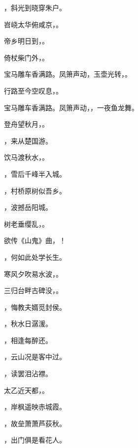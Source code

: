 \documentclass[12pt, a4paper, addpoints]{exam}
\begin{document}
\begin{questions}
\question[1] \uline{\qquad\qquad\qquad}，斜光到晓穿朱户。

\question[1] 岧峣太华俯咸京，\uline{\qquad\qquad\qquad}。

\question[1] 帝乡明日到，\uline{\qquad\qquad\qquad}。

\question[1] 倚杖柴门外，\uline{\qquad\qquad\qquad}。

\question[1] 宝马雕车香满路。凤箫声动，玉壶光转，\uline{\qquad\qquad\qquad}。

\question[1] 行路至今空叹息，\uline{\qquad\qquad\qquad}。

\question[1] 宝马雕车香满路。凤箫声动，\uline{\qquad\qquad\qquad}，一夜鱼龙舞。

\question[1] 登舟望秋月，\uline{\qquad\qquad\qquad}。

\question[1] \uline{\qquad\qquad\qquad}，来从楚国游。

\question[1] 饮马渡秋水，\uline{\qquad\qquad\qquad}。

\question[1] \uline{\qquad\qquad\qquad}，雪后千峰半入城。

\question[1] \uline{\qquad\qquad\qquad}，村桥原树似吾乡。

\question[1] \uline{\qquad\qquad\qquad}，波撼岳阳城。

\question[1] 树老垂缨乱，\uline{\qquad\qquad\qquad}。

\question[1] 欲传《山鬼》曲，\uline{\qquad\qquad\qquad}！

\question[1] \uline{\qquad\qquad\qquad}，何如此处学长生。

\question[1] 寒风夕吹易水波，\uline{\qquad\qquad\qquad}。

\question[1] 三归台畔古碑没，\uline{\qquad\qquad\qquad}。

\question[1] \uline{\qquad\qquad\qquad}，悔教夫婿觅封侯。

\question[1] \uline{\qquad\qquad\qquad}，秋水日潺湲。

\question[1] \uline{\qquad\qquad\qquad}，相逢每醉还。

\question[1] \uline{\qquad\qquad\qquad}，云山况是客中过。

\question[1] \uline{\qquad\qquad\qquad}，读罢泪沾襟。

\question[1] 太乙近天都，\uline{\qquad\qquad\qquad}。

\question[1] \uline{\qquad\qquad\qquad}，岸枫遥映赤城霞。

\question[1] \uline{\qquad\qquad\qquad}，故垒萧萧芦荻秋。

\question[1] \uline{\qquad\qquad\qquad}，出门俱是看花人。


\end{questions}
\end{document}
